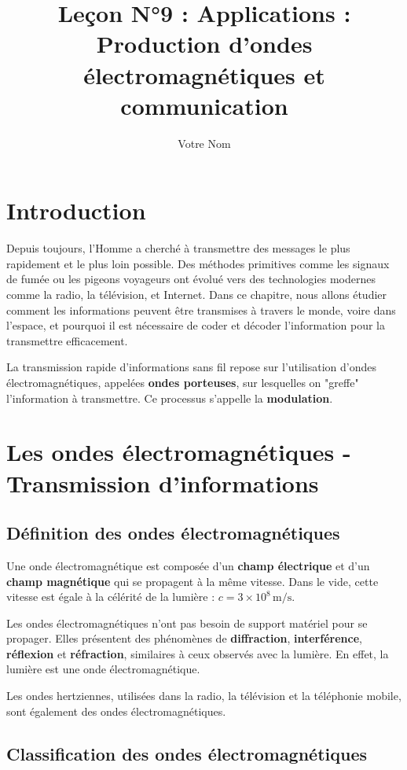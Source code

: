 \documentclass[12pt]{article}
\title{Leçon N°9 : Applications : Production d’ondes électromagnétiques et communication}
\author{Votre Nom}
\date{}
\begin{document}
\maketitle

\section*{Introduction}

Depuis toujours, l’Homme a cherché à transmettre des messages le plus rapidement et le plus loin possible. Des méthodes primitives comme les signaux de fumée ou les pigeons voyageurs ont évolué vers des technologies modernes comme la radio, la télévision, et Internet. Dans ce chapitre, nous allons étudier comment les informations peuvent être transmises à travers le monde, voire dans l’espace, et pourquoi il est nécessaire de coder et décoder l’information pour la transmettre efficacement.

La transmission rapide d’informations sans fil repose sur l’utilisation d’ondes électromagnétiques, appelées \textbf{ondes porteuses}, sur lesquelles on "greffe" l’information à transmettre. Ce processus s’appelle la \textbf{modulation}.

\section{Les ondes électromagnétiques - Transmission d’informations}

\subsection{Définition des ondes électromagnétiques}

Une onde électromagnétique est composée d’un \textbf{champ électrique} et d’un \textbf{champ magnétique} qui se propagent à la même vitesse. Dans le vide, cette vitesse est égale à la célérité de la lumière : \( c = 3 \times 10^8 \, \text{m/s} \).

Les ondes électromagnétiques n’ont pas besoin de support matériel pour se propager. Elles présentent des phénomènes de \textbf{diffraction}, \textbf{interférence}, \textbf{réflexion} et \textbf{réfraction}, similaires à ceux observés avec la lumière. En effet, la lumière est une onde électromagnétique.

Les ondes hertziennes, utilisées dans la radio, la télévision et la téléphonie mobile, sont également des ondes électromagnétiques.

\subsection{Classification des ondes électromagnétiques}
\end{document}
